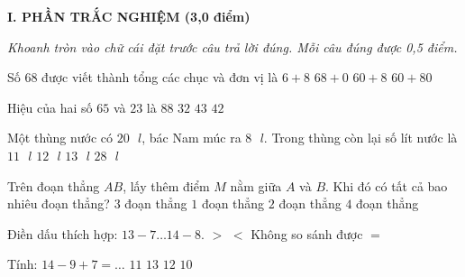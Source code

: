 
\setcounter{ex}{0}
\setcounter{bt}{0}

\textbf{\large I. PHẦN TRẮC NGHIỆM (3,0 điểm)}

{\itshape Khoanh tròn vào chữ cái đặt trước câu trả lời đúng. Mỗi câu đúng được 0,5 điểm.}

\begin{ex} %
Số $68$ được viết thành tổng các chục và đơn vị là
\choice
{$6 + 8$}
{$68 + 0$}
{\True $60 + 8$}
{$60 + 80$}
\end{ex}

\begin{ex} %
Hiệu của hai số $65$ và $23$ là
\choice
{$88$}
{$32$}
{$43$}
{\True $42$}
\end{ex}

\begin{ex} %
Một thùng nước có $20\text{ }l$, bác Nam múc ra $8\text{ }l$. Trong thùng còn lại số lít nước là
\choice
{$11\text{ }l$}
{\True $12\text{ }l$}
{$13\text{ }l$}
{$28\text{ }l$}
\end{ex}

\begin{ex} %
Trên đoạn thẳng $AB$, lấy thêm điểm $M$ nằm giữa $A$ và $B$. Khi đó có tất cả bao nhiêu đoạn thẳng?
\choice
{\True $3$ đoạn thẳng}
{$1$ đoạn thẳng}
{$2$ đoạn thẳng}
{$4$ đoạn thẳng}
\end{ex}

\begin{ex} %
Điền dấu thích hợp: $13 - 7 \dots 14 - 8$.
\choice
{$>$}
{$<$}
{Không so sánh được}
{\True $=$}
\end{ex}

\begin{ex} %
Tính: $14 - 9 + 7 = \dots$
\choice
{$11$}
{$13$}
{\True $12$}
{$10$}
\end{ex}

